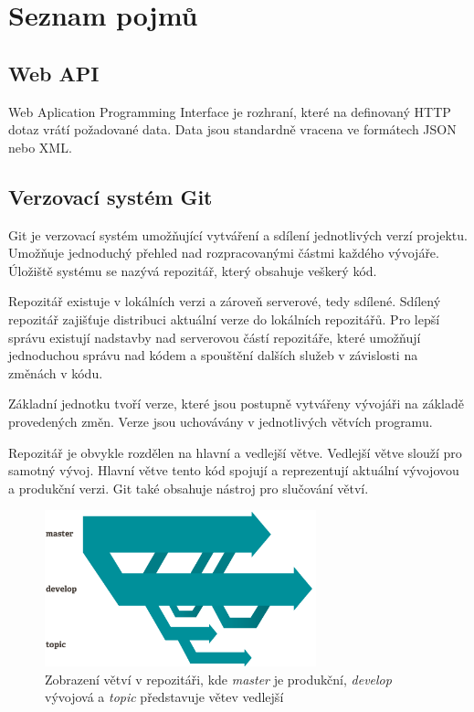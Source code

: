 \documentclass[thesis=B,czech]{FITthesis}[2012/06/26]
\begin{document}
\chapter{Seznam pojmů}

\section{Web API}
Web Aplication Programming Interface je rozhraní, které na definovaný HTTP dotaz vrátí požadované data. Data jsou standardně vracena ve formátech JSON nebo XML.

\section{Verzovací systém Git}
Git \cite{GIT} je verzovací systém umožňující vytváření a sdílení jednotlivých verzí projektu.
Umožňuje jednoduchý přehled nad rozpracovanými částmi každého vývojáře. Úložiště systému se nazývá repozitář, který obsahuje veškerý kód.
\par
Repozitář existuje v lokálních verzi a zároveň serverové, tedy sdílené. Sdílený repozitář zajišťuje distribuci aktuální verze do lokálních 
repozitářů. Pro lepší správu existují nadstavby nad serverovou částí repozitáře, které umožňují jednoduchou
správu nad kódem a spouštění dalších služeb v závislosti na změnách v kódu.
\par
Základní jednotku tvoří verze, které jsou postupně vytvářeny vývojáři na základě provedených změn.
Verze jsou uchovávány v jednotlivých větvích programu. 
\par
Repozitář je obvykle rozdělen na hlavní a vedlejší větve. Vedlejší větve slouží pro samotný vývoj. 
Hlavní větve tento kód spojují a reprezentují aktuální vývojovou a produkční verzi. Git také obsahuje nástroj pro slučování větví.

\begin{figure}[h]\centering
 	\includegraphics[width=0.7\textwidth]{resources/branches}
	\caption[Větve v Git repozitáři]{Zobrazení větví v repozitáři, kde \textit{master} je produkční, \textit{develop} vývojová a \textit{topic}
	představuje větev vedlejší}\label{fig:vetev}
\end{figure}
\end{document}
